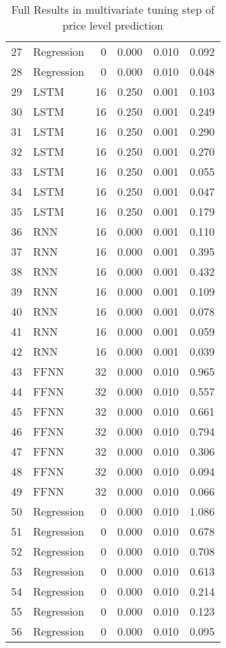 \begin{table}[ht]
\begin{tabular}{rlrrrr}
  27 & Regression &    0 & 0.000 & 0.010 & 0.092 \\ 
  28 & Regression &    0 & 0.000 & 0.010 & 0.048 \\ 
  29 & LSTM &   16 & 0.250 & 0.001 & 0.103 \\ 
  30 & LSTM &   16 & 0.250 & 0.001 & 0.249 \\ 
  31 & LSTM &   16 & 0.250 & 0.001 & 0.290 \\ 
  32 & LSTM &   16 & 0.250 & 0.001 & 0.270 \\ 
  33 & LSTM &   16 & 0.250 & 0.001 & 0.055 \\ 
  34 & LSTM &   16 & 0.250 & 0.001 & 0.047 \\ 
  35 & LSTM &   16 & 0.250 & 0.001 & 0.179 \\ 
  36 & RNN &   16 & 0.000 & 0.001 & 0.110 \\ 
  37 & RNN &   16 & 0.000 & 0.001 & 0.395 \\ 
  38 & RNN &   16 & 0.000 & 0.001 & 0.432 \\ 
  39 & RNN &   16 & 0.000 & 0.001 & 0.109 \\ 
  40 & RNN &   16 & 0.000 & 0.001 & 0.078 \\ 
  41 & RNN &   16 & 0.000 & 0.001 & 0.059 \\ 
  42 & RNN &   16 & 0.000 & 0.001 & 0.039 \\ 
  43 & FFNN &   32 & 0.000 & 0.010 & 0.965 \\ 
  44 & FFNN &   32 & 0.000 & 0.010 & 0.557 \\ 
  45 & FFNN &   32 & 0.000 & 0.010 & 0.661 \\ 
  46 & FFNN &   32 & 0.000 & 0.010 & 0.794 \\ 
  47 & FFNN &   32 & 0.000 & 0.010 & 0.306 \\ 
  48 & FFNN &   32 & 0.000 & 0.010 & 0.094 \\ 
  49 & FFNN &   32 & 0.000 & 0.010 & 0.066 \\ 
  50 & Regression &    0 & 0.000 & 0.010 & 1.086 \\ 
  51 & Regression &    0 & 0.000 & 0.010 & 0.678 \\ 
  52 & Regression &    0 & 0.000 & 0.010 & 0.708 \\ 
  53 & Regression &    0 & 0.000 & 0.010 & 0.613 \\ 
  54 & Regression &    0 & 0.000 & 0.010 & 0.214 \\ 
  55 & Regression &    0 & 0.000 & 0.010 & 0.123 \\ 
  56 & Regression &    0 & 0.000 & 0.010 & 0.095 \\ 
   \hline
\end{tabular}
\caption{Full Results in multivariate tuning step of price level prediction} 
\label{tab:level.multivar.par.tuning.full}
\end{table}
